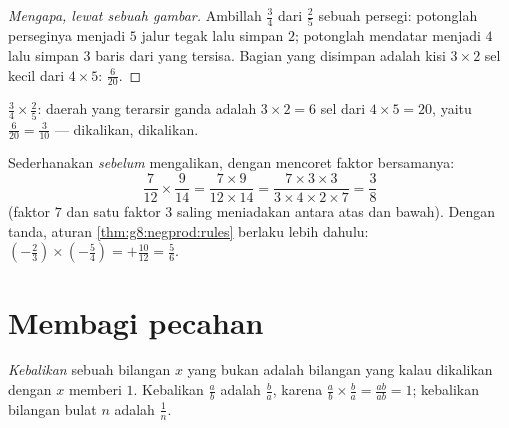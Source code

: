 \begin{proof}[Mengapa, lewat sebuah gambar]
Ambillah $\frac34$ dari $\frac25$ sebuah persegi: potonglah perseginya
menjadi $5$ jalur tegak lalu simpan $2$; potonglah mendatar menjadi
$4$ lalu simpan $3$ baris dari yang tersisa. Bagian yang disimpan
adalah kisi $3 \times 2$ sel kecil dari $4 \times 5$: 
$\frac{6}{20}$.
\end{proof}

\begin{omfigure}

{\small $\frac34 \times \frac25$: daerah yang terarsir ganda adalah
$3 \times 2 = 6$ sel dari $4 \times 5 = 20$, yaitu
$\frac{6}{20} = \frac{3}{10}$ ---  dikalikan, 
dikalikan.}
\end{omfigure}

\begin{example}\label{ex:g8:fractions:mult}
Sederhanakan \emph{sebelum} mengalikan, dengan mencoret faktor bersamanya:
\[
\frac{7}{12} \times \frac{9}{14}
= \frac{7 \times 9}{12 \times 14}
= \frac{7 \times 3 \times 3}{3 \times 4 \times 2 \times 7}
= \frac{3}{8}
\]
(faktor $7$ dan satu faktor $3$ saling meniadakan antara atas dan
bawah). Dengan tanda, aturan \cref{thm:g8:negprod:rules} berlaku lebih
dahulu: $\left(-\frac23\right) \times \left(-\frac{5}{4}\right) =
+\frac{10}{12} = \frac56$.
\end{example}

\section{Membagi pecahan}

\begin{definition}[Kebalikan]\label{def:g8:fractions:inverse}
\emph{Kebalikan} sebuah bilangan $x$ yang bukan 
adalah bilangan yang kalau dikalikan dengan $x$ memberi $1$.
Kebalikan $\frac ab$ adalah $\frac ba$, karena
$\frac ab \times \frac ba = \frac{ab}{ab} = 1$; kebalikan bilangan
bulat $n$ adalah $\frac1n$.
\end{definition}

